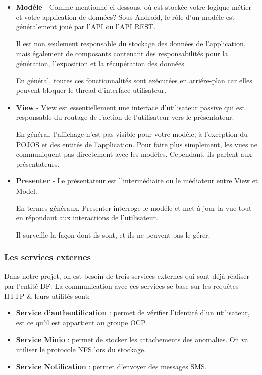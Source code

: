 \begin{itemize}

\item \textbf{Mod\'ele} - Comme mentionn\'e ci-dessous, o\`u est stock\'ee votre logique m\'etier et votre application de donn\'ees? Sous Android, le r\^ole d'un mod\'ele est g\'en\'eralement jou\'e par l'\gls{API} ou l'\gls{API} \gls{REST}.

Il est non seulement responsable du stockage des donn\'ees de l'application, mais \'egalement de composants contenant des responsabilit\'es pour la g\'en\'eration, l'exposition et la r\'ecup\'eration des donn\'ees.

En g\'en\'eral, toutes ces fonctionnalit\'es sont ex\'ecut\'ees en arri\'ere-plan car elles peuvent bloquer le thread d'interface utilisateur.

\item \textbf{View} - View est essentiellement une interface d'utilisateur passive qui est responsable du routage de l'action de l'utilisateur vers le pr\'esentateur. 

En g\'en\'eral, l'affichage n'est pas visible pour votre mod\'ele, \`a l'exception du POJOS et des entit\'es de l'application. Pour faire plus simplement, les vues ne communiquent pas directement avec les mod\'eles. Cependant, ils parlent aux pr\'esentateurs.

\item \textbf{Presenter} - Le pr\'esentateur est l'interm\'ediaire ou le m\'ediateur entre View et Model.

En termes g\'en\'eraux, Presenter interroge le mod\'ele et met \`a jour la vue tout en r\'epondant aux interactions de l'utilisateur.

Il surveille la fa\c{c}on dont ils sont, et ils ne peuvent pas le g\'erer.

\end{itemize}

\subsubsection{Les services externes}

Dans notre projet, on est besoin de trois services externes qui sont d\'ej\`a r\'ealiser par l'entit\'e \gls{DF}. La communication avec ces services se base sur les requ\^etes \gls{HTTP} \& leurs utilit\'es sont:
\begin{itemize}
\item \textbf{Service d'authentification} : permet de v\'erifier l'identit\'e d'un utilisateur, est ce qu'il est appartient au groupe \gls{OCP}.
\item \textbf{Service Minio} : permet de stocker les attachements des anomalies. On va utiliser le protocole \gls{NFS} lors du stockage.
\item \textbf{Service Notification} : permet d'envoyer des messages \gls{SMS}.
\end{itemize}



